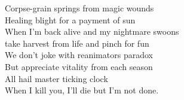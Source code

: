 Corpse-grain springs from magic wounds\\
Healing blight for a payment of sun\\
When I'm back alive and my nightmare swoons\\
take harvest from life and pinch for fun\\

We don't joke with reanimators paradox\\
But appreciate vitality from each season\\
All hail master ticking clock\\
When I kill you, I'll die but I'm not done.\\

